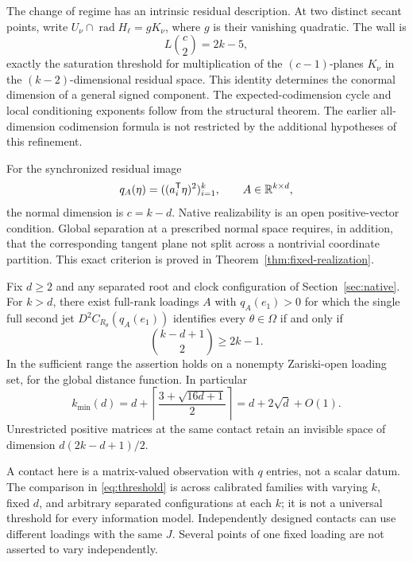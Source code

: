 The change of regime has an intrinsic residual description. At two distinct secant points, write $U_\nu\cap\operatorname{rad}H_\ell=gK_\nu$, where $g$ is their vanishing quadratic. The wall is
\[
 L\binom{c}{2}=2k-5,
\]
exactly the saturation threshold for multiplication of the $(c-1)$-planes $K_\nu$ in the $(k-2)$-dimensional residual space. This identity determines the conormal dimension of a general signed component. The expected-codimension cycle and local conditioning exponents follow from the structural theorem. The earlier all-dimension codimension formula is not restricted by the additional hypotheses of this refinement.

For the synchronized residual image
\[
 q_A(\eta)=((a_i^{\mathsf T}\eta)^2)_{i=1}^k,\qquad A\in\mathbb R^{k\times d},
\]
the normal dimension is $c=k-d$. Native realizability is an open positive-vector condition. Global separation at a prescribed normal space requires, in addition, that the corresponding tangent plane not split across a nontrivial coordinate partition. This exact criterion is proved in Theorem~\ref{thm:fixed-realization}.
\begin{theorem}\label{thm:threshold}
Fix $d\ge2$ and any separated root and clock configuration of Section~\ref{sec:native}. For $k>d$, there exist full-rank loadings $A$ with $q_A(e_1)>0$ for which the single full second jet $D^2C_{R_\theta}(q_A(e_1))$ identifies every $\theta\in\Omega$ if and only if
\[
 \binom{k-d+1}{2}\ge2k-1.
\]
In the sufficient range the assertion holds on a nonempty Zariski-open loading set, for the global distance function. In particular
\begin{equation}\label{eq:threshold}
 k_{\min}(d)=d+\left\lceil\frac{3+\sqrt{16d+1}}2\right\rceil
            =d+2\sqrt d+O(1).
\end{equation}
Unrestricted positive matrices at the same contact retain an invisible space of dimension $d(2k-d+1)/2$.
\end{theorem}
A contact here is a matrix-valued observation with $q$ entries, not a scalar datum. The comparison in \eqref{eq:threshold} is across calibrated families with varying $k$, fixed $d$, and arbitrary separated configurations at each $k$; it is not a universal threshold for every information model. Independently designed contacts can use different loadings with the same $J$. Several points of one fixed loading are not asserted to vary independently.


